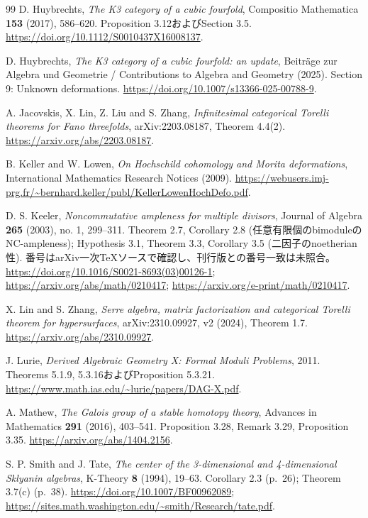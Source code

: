 \begin{thebibliography}{99}
D. Huybrechts, \emph{The K3 category of a cubic fourfold},
Compositio Mathematica \textbf{153} (2017), 586--620.
Proposition 3.12およびSection 3.5.
\url{https://doi.org/10.1112/S0010437X16008137}.

D. Huybrechts, \emph{The K3 category of a cubic fourfold: an update},
Beiträge zur Algebra und Geometrie / Contributions to Algebra and Geometry (2025).
Section 9: Unknown deformations.
\url{https://doi.org/10.1007/s13366-025-00788-9}.

A. Jacovskis, X. Lin, Z. Liu and S. Zhang,
\emph{Infinitesimal categorical Torelli theorems for Fano threefolds},
arXiv:2203.08187, Theorem 4.4(2).
\url{https://arxiv.org/abs/2203.08187}.

B. Keller and W. Lowen,
\emph{On Hochschild cohomology and Morita deformations},
International Mathematics Research Notices (2009).
\url{https://webusers.imj-prg.fr/~bernhard.keller/publ/KellerLowenHochDefo.pdf}.

D. S. Keeler, \emph{Noncommutative ampleness for multiple divisors},
Journal of Algebra \textbf{265} (2003), no. 1, 299--311.
Theorem 2.7, Corollary 2.8 (任意有限個のbimoduleのNC-ampleness);
Hypothesis 3.1, Theorem 3.3, Corollary 3.5 (二因子のnoetherian性).
番号はarXiv一次TeXソースで確認し、刊行版との番号一致は未照合。
\url{https://doi.org/10.1016/S0021-8693(03)00126-1};
\url{https://arxiv.org/abs/math/0210417};
\url{https://arxiv.org/e-print/math/0210417}.

X. Lin and S. Zhang,
\emph{Serre algebra, matrix factorization and categorical Torelli theorem for hypersurfaces},
arXiv:2310.09927, v2 (2024), Theorem 1.7.
\url{https://arxiv.org/abs/2310.09927}.

J. Lurie, \emph{Derived Algebraic Geometry X: Formal Moduli Problems},
2011. Theorems 5.1.9, 5.3.16およびProposition 5.3.21.
\url{https://www.math.ias.edu/~lurie/papers/DAG-X.pdf}.

A. Mathew, \emph{The Galois group of a stable homotopy theory},
Advances in Mathematics \textbf{291} (2016), 403--541.
Proposition 3.28, Remark 3.29, Proposition 3.35.
\url{https://arxiv.org/abs/1404.2156}.

S. P. Smith and J. Tate,
\emph{The center of the 3-dimensional and 4-dimensional Sklyanin algebras},
K-Theory \textbf{8} (1994), 19--63.
Corollary 2.3 (p.~26); Theorem 3.7(c) (p.~38).
\url{https://doi.org/10.1007/BF00962089};
\url{https://sites.math.washington.edu/~smith/Research/tate.pdf}.


\end{thebibliography}
